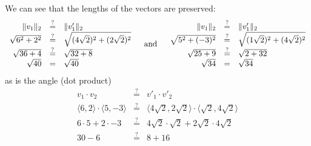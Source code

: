 We can see that the lengths of the vectors are preserved: 
\[
\begin{array}{rcl}
\|v_1\|_2 & \stackrel{?}{=} & \|v'_1\|_2\\
\sqrt{6^2+2^2} & \stackrel{?}{=} & \sqrt{(4\sqrt{2})^2+(2\sqrt{2})^2}\\
\sqrt{36+4} & \stackrel{?}{=} & \sqrt{32 + 8}\\
\sqrt{40} & = & \sqrt{40}\\
\end{array}\;\;\;\;\textnormal{and}\;\;\;\; 
\begin{array}{rcl}
\|v_1\|_2 & \stackrel{?}{=} & \|v'_1\|_2\\
\sqrt{5^2+(-3)^2} & \stackrel{?}{=} & \sqrt{(1\sqrt{2})^2+(4\sqrt{2})^2}\\
\sqrt{25+9} & \stackrel{?}{=} & \sqrt{2 + 32}\\
\sqrt{34} & = & \sqrt{34}\\
\end{array} 
\]
as is the angle (dot product)
\[\begin{array}{rcl}
v_1 \cdot v_2 & \stackrel{?}{=} & v'_1 \cdot v'_2 \\
\langle6,2\rangle\cdot \langle5,-3\rangle&  \stackrel{?}{=}  & \langle4\sqrt{2},2\sqrt{2}\rangle\cdot\langle\sqrt{2},4\sqrt{2}\rangle\\
6\cdot5+2\cdot-3&  \stackrel{?}{=}  & 4\sqrt{2}\cdot\sqrt{2}+2\sqrt{2}\cdot4\sqrt{2}\\
30-6 &  \stackrel{?}{=}  & 8 + 16\\

\end{array} 
\]

